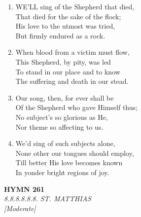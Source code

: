 \begin{enumerate}
    \item WE'LL sing of the Shepherd that died, \\
        That died for the sake of the flock; \\
        His love to the utmost was tried, \\
        But firmly endured as a rock.

    \item When blood from a victim must flow, \\
        This Shepherd, by pity, was led \\
        To stand in our place and to know \\
        The suffering and death in our stead.

    \item Our song, then, for ever shall be \\
        Of the Shepherd who gave Himself thus; \\
        No subject's so glorious as He, \\
        Nor theme so affecting to us.

    \item We'd sing of such subjects alone, \\
        None other our tongues should employ, \\
        Till better His love becomes known \\
        In yonder bright regions of joy.

\end{enumerate}

\newpage
\begin{center}
    {\Large \textbf{HYMN 261}}
    \\
    \textit{8.8.8.8.8.8. ST. MATTHIAS}
    \\
    \textit{\small [Moderate]}
\end{center}
\vspace{1em}

